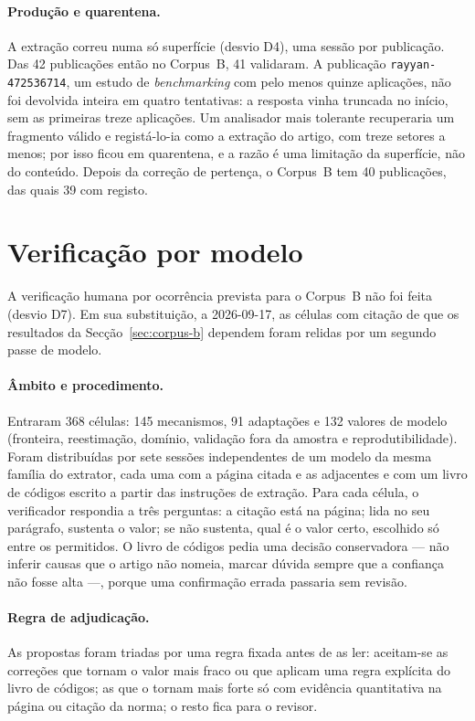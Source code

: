\paragraph{Produção e quarentena.} A extração correu numa só superfície
(desvio D4), uma sessão por publicação. Das 42 publicações então no
Corpus~B, 41 validaram. A publicação \texttt{rayyan-472536714}, um estudo de
\emph{benchmarking} com pelo menos quinze aplicações, não foi devolvida
inteira em quatro tentativas: a resposta vinha truncada no início, sem as
primeiras treze aplicações. Um analisador mais tolerante recuperaria um
fragmento válido e registá-lo-ia como a extração do artigo, com treze setores
a menos; por isso ficou em quarentena, e a razão é uma limitação da
superfície, não do conteúdo. Depois da correção de pertença, o Corpus~B tem
40 publicações, das quais 39 com registo.

\section{Verificação por modelo}
\label{sec:apB-verificacao}

A verificação humana por ocorrência prevista para o Corpus~B não foi feita
(desvio D7). Em sua substituição, a 2026-09-17, as células com citação de que
os resultados da Secção~\ref{sec:corpus-b} dependem foram relidas por um
segundo passe de modelo.

\paragraph{Âmbito e procedimento.} Entraram 368 células: 145 mecanismos, 91
adaptações e 132 valores de modelo (fronteira, reestimação, domínio,
validação fora da amostra e reprodutibilidade). Foram distribuídas por sete
sessões independentes de um modelo da mesma família do extrator, cada uma
com a página citada e as adjacentes e com um livro de códigos escrito a partir
das instruções de extração. Para cada célula, o verificador respondia a três
perguntas: a citação está na página; lida no seu parágrafo, sustenta o valor;
se não sustenta, qual é o valor certo, escolhido só entre os permitidos. O
livro de códigos pedia uma decisão conservadora --- não inferir causas que o
artigo não nomeia, marcar dúvida sempre que a confiança não fosse alta ---,
porque uma confirmação errada passaria sem revisão.

\paragraph{Regra de adjudicação.} As propostas foram triadas por uma regra
fixada antes de as ler: aceitam-se as correções que tornam o valor mais fraco
ou que aplicam uma regra explícita do livro de códigos; as que o tornam mais
forte só com evidência quantitativa na página ou citação da norma; o resto
fica para o revisor.

